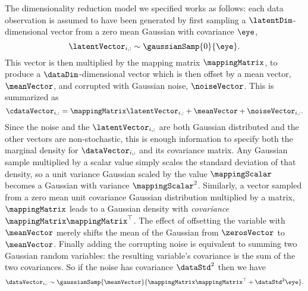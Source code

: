 The dimensionality reduction model we specified works as follows: each
data observation is assumed to have been generated by first sampling a
$\latentDim$-dimensional vector from a zero mean Gaussian with
covariance $\eye$,
\[
\latentVector_{i, :}\sim \gaussianSamp{0}{\eye}.
\]
This vector is then multiplied by the mapping matrix $\mappingMatrix$, to produce a $\dataDim$-dimensional vector which is then offset by a mean vector, $\meanVector$, and corrupted with Gaussian noise, $\noiseVector$. This is summarized as
\[
\cdataVector_{i, :} = \mappingMatrix \latentVector_{i, :} + \meanVector + \noiseVector_{i, :}.
\]
Since the noise and the $\latentVector_{i, :}$ are both Gaussian
distributed and the other vectors are non-stochastic, this is enough
information to specify both the marginal density for $\dataVector_{i,
  :}$ and its covariance matrix. Any Gaussian sample multiplied by a
scalar value simply scales the standard deviation of that density, so
a unit variance Gaussian scaled by the value $\mappingScalar$ becomes
a Gaussian with variance $\mappingScalar^2$. Similarly, a vector
sampled from a zero mean unit covariance Gaussian distribution
multiplied by a matrix, $\mappingMatrix$ leads to a Gaussian density
with \emph{covariance} $\mappingMatrix\mappingMatrix^\top$. The effect
of offsetting the variable with $\meanVector$ merely shifts the mean
of the Gaussian from $\zerosVector$ to $\meanVector$. Finally adding the
corrupting noise is equivalent to summing two Gaussian random
variables: the resulting variable's covariance is the sum of the two
covariances. So if the noise has covariance $\dataStd^2$ then we have
\[
\dataVector_{i, :} \sim
\gaussianSamp{\meanVector}{\mappingMatrix\mappingMatrix^\top +
  \dataStd^2\eye}.
\]

